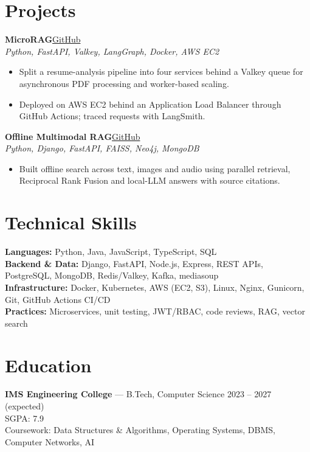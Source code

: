 \documentclass[letterpaper,10pt]{article}
\newcommand{\entry}[4]{%
  \textbf{#1}\hfill #2\\
  \textit{#3}\hfill #4\par
}
\begin{document}
\section*{Projects}
\entry{MicroRAG}{\href{https://github.com/mukulpythondev/microRAG}{GitHub}}{Python, FastAPI, Valkey, LangGraph, Docker, AWS EC2}{}
\begin{itemize}
  \item Split a resume-analysis pipeline into four services behind a Valkey queue for asynchronous PDF processing and worker-based scaling.
  \item Deployed on AWS EC2 behind an Application Load Balancer through GitHub Actions; traced requests with LangSmith.
\end{itemize}
\vspace{3pt}
\entry{Offline Multimodal RAG}{\href{https://github.com/mukulpythondev/sih}{GitHub}}{Python, Django, FastAPI, FAISS, Neo4j, MongoDB}{}
\begin{itemize}
  \item Built offline search across text, images and audio using parallel retrieval, Reciprocal Rank Fusion and local-LLM answers with source citations.
\end{itemize}

\section*{Technical Skills}
\textbf{Languages:} Python, Java, JavaScript, TypeScript, SQL\\[2pt]
\textbf{Backend \& Data:} Django, FastAPI, Node.js, Express, REST APIs, PostgreSQL, MongoDB, Redis/Valkey, Kafka, mediasoup\\[2pt]
\textbf{Infrastructure:} Docker, Kubernetes, AWS (EC2, S3), Linux, Nginx, Gunicorn, Git, GitHub Actions CI/CD\\[2pt]
\textbf{Practices:} Microservices, unit testing, JWT/RBAC, code reviews, RAG, vector search

\section*{Education}
\textbf{IMS Engineering College} --- B.Tech, Computer Science \hfill 2023 -- 2027 (expected)\\
SGPA: 7.9\\
Coursework: Data Structures \& Algorithms, Operating Systems, DBMS, Computer Networks, AI
\end{document}
